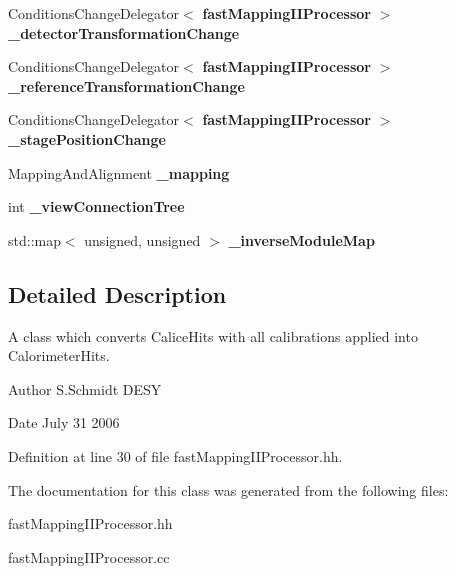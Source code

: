 \begin{DoxyCompactItemize}
\item 
ConditionsChangeDelegator$<$ {\bf fastMappingIIProcessor} $>$ {\bfseries \_\-detectorTransformationChange}\label{classCALICE_1_1fastMappingIIProcessor_ad0ad5353b297ad496673e4cddb12b4b6}

\item 
ConditionsChangeDelegator$<$ {\bf fastMappingIIProcessor} $>$ {\bfseries \_\-referenceTransformationChange}\label{classCALICE_1_1fastMappingIIProcessor_a237eeddbe142d84c163d3449224ec161}

\item 
ConditionsChangeDelegator$<$ {\bf fastMappingIIProcessor} $>$ {\bfseries \_\-stagePositionChange}\label{classCALICE_1_1fastMappingIIProcessor_a5f259d239bffa8e68990f72199009810}

\item 
MappingAndAlignment {\bfseries \_\-mapping}\label{classCALICE_1_1fastMappingIIProcessor_ad9dbad825d7b12c0e384651966588f32}

\item 
int {\bfseries \_\-viewConnectionTree}\label{classCALICE_1_1fastMappingIIProcessor_a5512a3532b85add946d846b64112ff3c}

\item 
std::map$<$ unsigned, unsigned $>$ {\bfseries \_\-inverseModuleMap}\label{classCALICE_1_1fastMappingIIProcessor_a608616991c0a6a9aacc5230b676d059c}

\end{DoxyCompactItemize}


\subsection{Detailed Description}
A class which converts CaliceHits with all calibrations applied into CalorimeterHits. \begin{DoxyAuthor}{Author}
S.Schmidt DESY 
\end{DoxyAuthor}
\begin{DoxyDate}{Date}
July 31 2006 
\end{DoxyDate}


Definition at line 30 of file fastMappingIIProcessor.hh.

The documentation for this class was generated from the following files:\begin{DoxyCompactItemize}
\item 
fastMappingIIProcessor.hh\item 
fastMappingIIProcessor.cc\end{DoxyCompactItemize}
